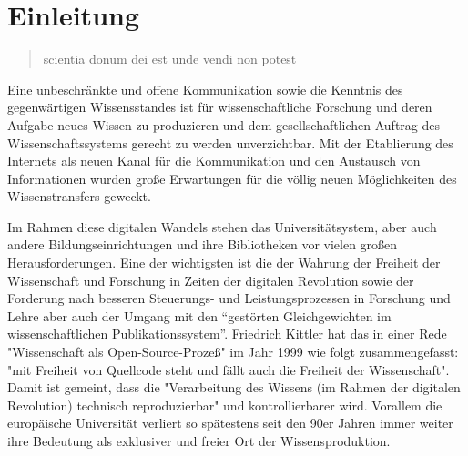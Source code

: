 \chapter{Einleitung} 

\begin{quote}
scientia donum dei est unde vendi non potest
\end{quote}Eine unbeschränkte und offene Kommunikation sowie die Kenntnis des gegenwärtigen Wissensstandes ist für wissenschaftliche Forschung und deren Aufgabe neues Wissen zu produzieren und dem gesellschaftlichen Auftrag des Wissenschaftssystems gerecht zu werden unverzichtbar\cite{Hanekop_2014}\cite{glaeser2006}\cite{gibbons_1994}\cite{Luhmann1998}. Mit der Etablierung des Internets als neuen Kanal für die Kommunikation und den Austausch von Informationen wurden große Erwartungen für die völlig neuen Möglichkeiten des Wissenstransfers geweckt\cite{Hanekop_2014}\cite{Goodrum_2001}\cite{Lawrence_1999}. 

Im Rahmen diese digitalen Wandels stehen das Universitätsystem, aber auch andere Bildungseinrichtungen und ihre Bibliotheken vor vielen großen Herausforderungen\cite{Harter2006}\cite{Gu_don_2004}\cite{osterloh2008anreize}. Eine der wichtigsten ist die der Wahrung der Freiheit der Wissenschaft und Forschung in Zeiten der digitalen Revolution sowie der Forderung nach besseren Steuerungs- und Leistungsprozessen in Forschung und Lehre\cite{Adler_2009}\cite{gibbons_1994} aber auch der Umgang mit den “gestörten Gleichgewichten im wissenschaftlichen Publikationssystem”\cite{cite:0}. Friedrich Kittler hat das in einer Rede "Wissenschaft als Open-Source-Prozeß" im Jahr 1999 wie folgt zusammengefasst: "mit Freiheit von Quellcode steht und fällt auch die Freiheit der Wissenschaft". Damit ist gemeint, dass die "Verarbeitung des Wissens (im Rahmen der digitalen Revolution) technisch reproduzierbar"\cite{cite:1} und kontrollierbarer wird. Vorallem die europäische Universität verliert so spätestens seit den 90er Jahren immer weiter ihre Bedeutung als exklusiver und freier Ort der Wissensproduktion.


